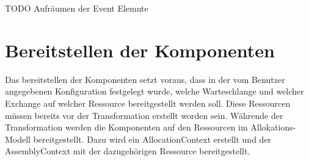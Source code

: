 TODO Aufräumen der Event Elemnte

\section{Bereitstellen der Komponenten}
Das bereitstellen der Komponenten setzt voraus, dass in der vom Benutzer angegebenen Konfiguration festgelegt wurde, welche Warteschlange und welcher Exchange auf welcher Ressource bereitgestellt werden soll. Diese Ressourcen müssen bereits vor der Transformation erstellt worden sein. Währende der Transformation werden die Komponenten auf den Ressourcen im Allokations-Modell bereitgestellt. Dazu wird ein AllocationContext erstellt und der AssemblyContext mit der dazugehörigen Ressource bereitgestellt.

